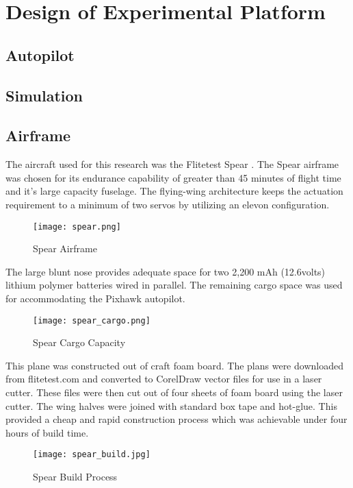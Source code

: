 \chapter{Design of Experimental Platform}\label{ch:platform}

\section{Autopilot}

\section{Simulation}

\section{Airframe}

The aircraft used for this research was the Flitetest Spear \cite{flitetest}.  The Spear airframe was chosen for its endurance capability of greater than 45 minutes of flight time and it's large capacity fuselage.  The flying-wing architecture keeps the actuation requirement to a minimum of two servos by utilizing an elevon configuration.  

\begin{figure}[!h]
 \centering
  \texttt{[image: spear.png]}
  \caption{Spear Airframe}
  \label{fig:spear}
\end{figure}

The large blunt nose provides adequate space for two 2,200 mAh (12.6volts) lithium polymer batteries wired in parallel.  The remaining cargo space was used for accommodating the Pixhawk autopilot.

\begin{figure}[!h]
 \centering
  \texttt{[image: spear\_cargo.png]}
  \caption{Spear Cargo Capacity}
  \label{fig:spear_cargo}
\end{figure}

This plane was constructed out of craft foam board.  The plans were downloaded from flitetest.com\cite{flitetest} and converted to CorelDraw vector files for use in a laser cutter.  These files were then cut out of four sheets of foam board using the laser cutter.  The wing halves were joined with standard box tape and hot-glue.  This provided a cheap and rapid construction process which was achievable under four hours of build time.

\begin{figure}[!h]
 \centering
  \texttt{[image: spear\_build.jpg]}
  \caption{Spear Build Process}
  \label{fig:spear_build}
\end{figure}

